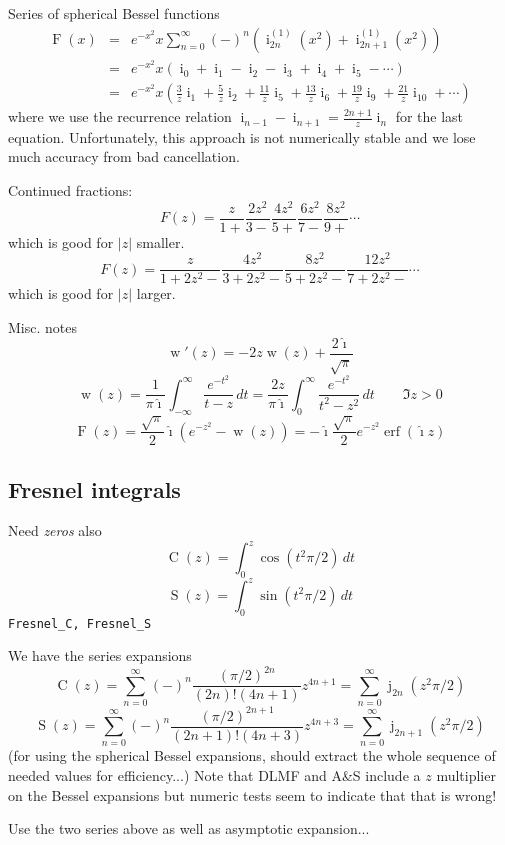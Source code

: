 \documentclass[10pt,dvipdfmx,letterpaper,twoside]{article}
\DeclareMathOperator{\erf}{erf}
\let\O=\operatorname
\newcommand{\ii}{{\hat{\imath}}}
\newenvironment{implementation}{\noindent\begin{framed}}{\end{framed}}
\begin{document}
Series of spherical Bessel functions
\begin{eqnarray*}
\O{F}(x) &=& e^{-x^2} x \sum_{n=0}^\infty (-)^n \left( \O{i}^{(1)}_{2n}(x^2) + \O{i}^{(1)}_{2n+1}(x^2) \right) \\
         &=& e^{-x^2} x \left( \O{i}_0 + \O{i}_1 - \O{i}_2 - \O{i}_3 + \O{i}_4 + \O{i}_5 - \cdots \right) \\
         &=& e^{-x^2} x \left( \frac{3}{z}\O{i}_1 + \frac{5}{z}\O{i}_2 + \frac{11}{z}\O{i}_5 + \frac{13}{z}\O{i}_6 + \frac{19}{z}\O{i}_9 + \frac{21}{z}\O{i}_{10} + \cdots \right)
\end{eqnarray*}
where we use the recurrence relation $\O{i}_{n-1} - \O{i}_{n+1} = \tfrac{2n+1}{z}\O{i}_n$ for the last equation.
Unfortunately, this approach is not numerically stable and we lose much accuracy from bad cancellation.

Continued fractions:
\[ F(z) = \frac{z}{1+} \frac{2z^2}{3-} \frac{4z^2}{5+} \frac{6z^2}{7-} \frac{8z^2}{9+} \cdots \]
which is good for $|z|$ smaller.
\[ F(z) = \frac{z}{1+2z^2-} \frac{4z^2}{3+2z^2-} \frac{8z^2}{5+2z^2-} \frac{12z^2}{7+2z^2-} \cdots \]
which is good for $|z|$ larger.

Misc. notes
\[ \O{w}'(z) = -2z \O{w}(z) + \frac{2\ii}{\sqrt\pi} \]
\[ \O{w}(z) = \frac{1}{\pi\ii} \int_{-\infty}^\infty \frac{e^{-t^2}}{t-z}\,dt = \frac{2z}{\pi\ii} \int_0^\infty \frac{e^{-t^2}}{t^2-z^2}\,dt \qquad \Im z>0 \]
\[ \O{F}(z) = \frac{\sqrt\pi}{2}\ii\left(e^{-z^2} - \O{w}(z)\right) = -\ii\frac{\sqrt\pi}{2} e^{-z^2}\erf(\ii z) \]

\subsection{Fresnel integrals}
Need {\em zeros} also
\[ \O{C}(z) = \int_0^z \cos(t^2 \pi/2)\,dt \]
\[ \O{S}(z) = \int_0^z \sin(t^2 \pi/2)\,dt \]
{\tt Fresnel\_C, Fresnel\_S}

We have the series expansions
\[ \O{C}(z) = \sum_{n=0}^\infty(-)^n\frac{(\pi/2)^{2n}}{(2n)!(4n+1)}z^{4n+1}
    = \sum_{n=0}^\infty \O{j}_{2n}(z^2\pi/2) \]
\[ \O{S}(z) = \sum_{n=0}^\infty(-)^n\frac{(\pi/2)^{2n+1}}{(2n+1)!(4n+3)}z^{4n+3}
    = \sum_{n=0}^\infty \O{j}_{2n+1}(z^2\pi/2) \]
(for using the spherical Bessel expansions, should extract the whole sequence of needed values for efficiency...)
Note that DLMF and A\&S include a $z$ multiplier on the Bessel expansions but numeric tests seem to indicate that that
is wrong!
\begin{implementation}
Use the two series above as well as asymptotic expansion...
\end{implementation}
\end{document}
